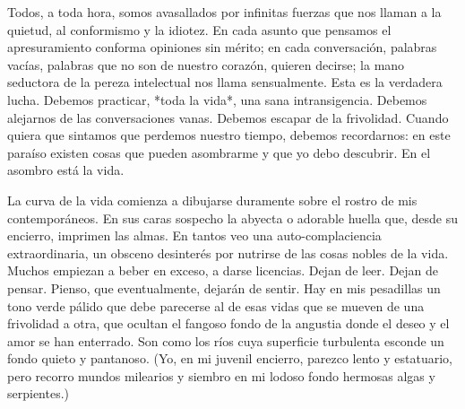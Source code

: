 \documentclass[a4paper, 12pt]{article}
\begin{document}
Todos, a toda hora, somos avasallados por infinitas fuerzas que nos llaman a la
quietud, al conformismo y la idiotez. En cada asunto que pensamos el
apresuramiento conforma opiniones sin mérito; en cada conversación, palabras
vacías, palabras que no son de nuestro corazón, quieren decirse; la mano
seductora de la pereza intelectual nos llama sensualmente. Esta es la verdadera
lucha. Debemos practicar, *toda la vida*, una sana intransigencia. Debemos
alejarnos de las conversaciones vanas. Debemos escapar de la frivolidad. Cuando
quiera que sintamos que perdemos nuestro tiempo, debemos recordarnos: en este
paraíso existen cosas que pueden asombrarme y que yo debo descubrir. En el
asombro está la vida. 

La curva de la vida comienza a dibujarse duramente sobre el rostro de mis
contemporáneos. En sus caras sospecho la abyecta o adorable huella
que, desde su encierro, imprimen las almas. En tantos veo una auto-complaciencia
extraordinaria, un obsceno desinterés por nutrirse de las cosas nobles de la
vida. Muchos empiezan a beber en exceso, a darse licencias. Dejan de leer. Dejan
de pensar. Pienso, que eventualmente, dejarán de sentir. Hay en mis pesadillas
un tono verde pálido que debe parecerse al de esas vidas que se mueven de una
frivolidad a otra, que ocultan el fangoso fondo de la angustia donde el deseo y
el amor se han enterrado. Son como los ríos cuya superficie turbulenta esconde
un fondo quieto y pantanoso. (Yo, en mi juvenil encierro, parezco lento y
estatuario, pero recorro mundos milearios y siembro en mi lodoso fondo
hermosas algas y serpientes.)
\end{document}
